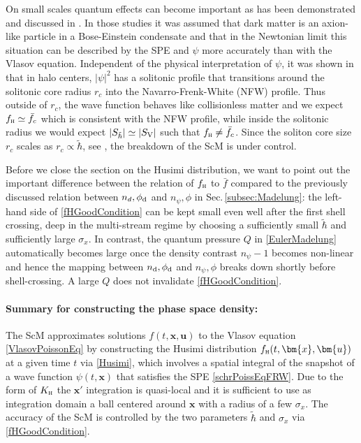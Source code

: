 \documentclass[twocolumn, nofootinbib, showpacs, superscriptaddress]{revtex4-1}
\renewcommand{\H}[0]{{\textsc{h}}}
\newcommand{\sigx}{{\sigma_{\! x}}}
\newcommand{\thbar}{\tilde\hbar}
\renewcommand{\d}[0]{{\rm{d}}}
\newcommand{\vx}[0]{\bm{x} }
\newcommand{\vu}[0]{\bm{u} }
\newcommand{\npsi}{n_\psi}
\newcommand*\myotherbluebox[1]{%
{\setlength{\fboxsep}{1pt}\colorbox{myblue}{#1}}}
\begin{document}
On small scales quantum effects can become important as has been demonstrated and discussed in \cite{SchiveChiuehBroadhurst2014, SchiveLiaoWooEtal2014, SchwabeNiemeyerEngels2016, HuiOstrikerTremaineEtal2016}. 
In those studies it was assumed that dark matter is an axion-like particle in a Bose-Einstein condensate and that in the Newtonian limit this situation can be described by the SPE 
and $\psi$ more accurately  
than with the Vlasov equation.
 Independent of the physical interpretation of $\psi$, it was shown in \cite{SchiveChiuehBroadhurst2014,SchiveLiaoWooEtal2014,SchwabeNiemeyerEngels2016} that in halo centers, $|\psi|^2$ has a solitonic profile that transitions around the solitonic core radius $r_c$ into the Navarro-Frenk-White (NFW) profile. 
 Thus outside of $r_c$, the wave function behaves like collisionless matter and we expect $f_\H \simeq \bar f_c$ which is consistent with the NFW profile, 
while inside the solitonic radius we would expect $|S_{\thbar}| \simeq |S_{\rm V}|$ such that $f_\H \neq \bar f_c$. 
Since the soliton core size $r_c$ scales as $r_c \propto \thbar$, see \cite{SchiveLiaoWooEtal2014}, the breakdown of the ScM is under control.
 
Before we close the section on the Husimi distribution, we want to point out the important difference between the relation of $f_\H$ to $\bar f$ compared to the previously discussed relation between $n_d, \phi_\d$ and $\npsi, \phi$ in Sec.\,\eqref{subsec:Madelung}: the left-hand side of \eqref{fHGoodCondition} can be kept small even well after the first shell crossing, 
deep in the multi-stream regime \cite{T89,WK93, UhlemannKoppHaugg2014} by choosing a sufficiently small $\thbar$ and sufficiently large $\sigx$. 
 In contrast, the quantum pressure $Q$ in \eqref{EulerMadelung} automatically becomes large once the density contrast $\npsi -1$ becomes non-linear and hence the mapping between $n_\d, \phi_\d$ and $\npsi, \phi$ breaks down shortly before shell-crossing. A large $Q$ does not invalidate \eqref{fHGoodCondition}.

 \paragraph*{Summary for constructing the phase space density:}
\myotherbluebox{\begin{minipage}{0.48\textwidth}The ScM approximates solutions $f(t,\vx,\vu)$ to the Vlasov equation \eqref{VlasovPoissonEq} by constructing the Husimi distribution $f_\H(t,\vx,\vu)$ at a given time $t$ via \eqref{Husimi}, which involves a spatial integral of the snapshot of a wave function  $\psi(t, \vx)$ that satisfies the SPE \eqref{schrPoissEqFRW}. 
Due to the form of $K_\H$ the $\vx'$ integration is quasi-local and it is sufficient to use as integration domain a ball centered around $\vx$ with a radius of a few $\sigx$.
The accuracy of the ScM is controlled by the two parameters $\thbar$ and $\sigx$ via \eqref{fHGoodCondition}.\end{minipage}}
\end{document}
